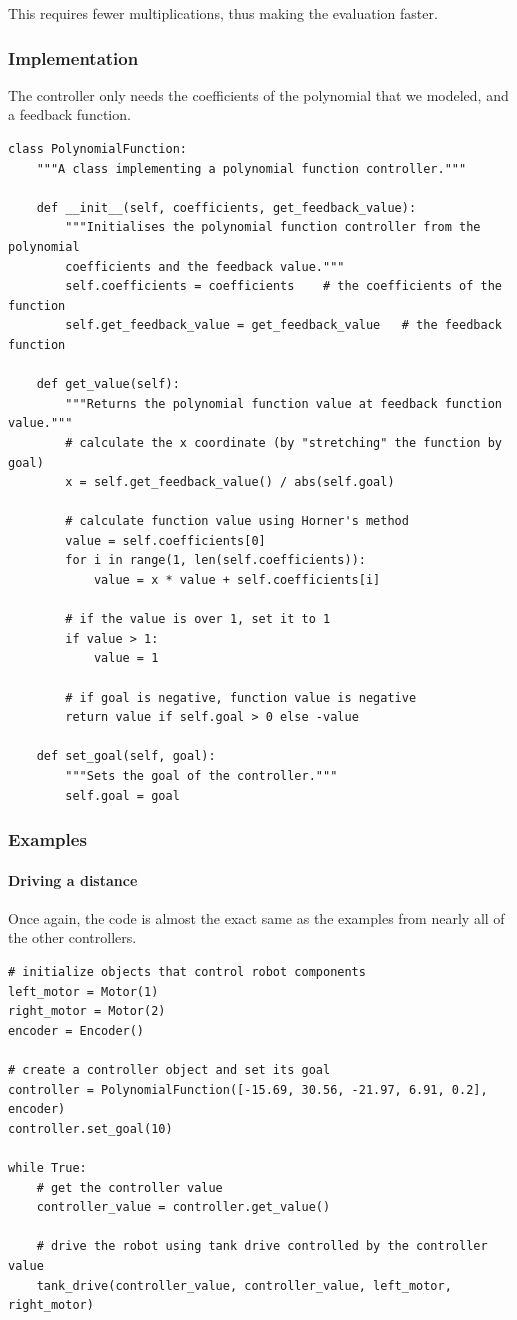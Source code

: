 \documentclass[12pt,twoside]{article}
\let\subsubsubsection\paragraph
\begin{document}
This requires fewer multiplications, thus making the evaluation faster.


\subsubsection{Implementation}
The controller only needs the coefficients of the polynomial that we modeled, and a feedback function.

\begin{verbatim}
class PolynomialFunction:
    """A class implementing a polynomial function controller."""

    def __init__(self, coefficients, get_feedback_value):
        """Initialises the polynomial function controller from the polynomial
        coefficients and the feedback value."""
        self.coefficients = coefficients    # the coefficients of the function
        self.get_feedback_value = get_feedback_value   # the feedback function

    def get_value(self):
        """Returns the polynomial function value at feedback function value."""
        # calculate the x coordinate (by "stretching" the function by goal)
        x = self.get_feedback_value() / abs(self.goal)

        # calculate function value using Horner's method
        value = self.coefficients[0]
        for i in range(1, len(self.coefficients)):
            value = x * value + self.coefficients[i]

        # if the value is over 1, set it to 1
        if value > 1:
            value = 1

        # if goal is negative, function value is negative
        return value if self.goal > 0 else -value

    def set_goal(self, goal):
        """Sets the goal of the controller."""
        self.goal = goal
\end{verbatim}



\subsubsection{Examples}

\subsubsubsection{Driving a distance}
Once again, the code is almost the exact same as the examples from nearly all of the other controllers.

\begin{verbatim}
# initialize objects that control robot components
left_motor = Motor(1)
right_motor = Motor(2)
encoder = Encoder()

# create a controller object and set its goal
controller = PolynomialFunction([-15.69, 30.56, -21.97, 6.91, 0.2], encoder)
controller.set_goal(10)

while True:
    # get the controller value
    controller_value = controller.get_value()

    # drive the robot using tank drive controlled by the controller value
    tank_drive(controller_value, controller_value, left_motor, right_motor)
\end{verbatim}
\end{document}
